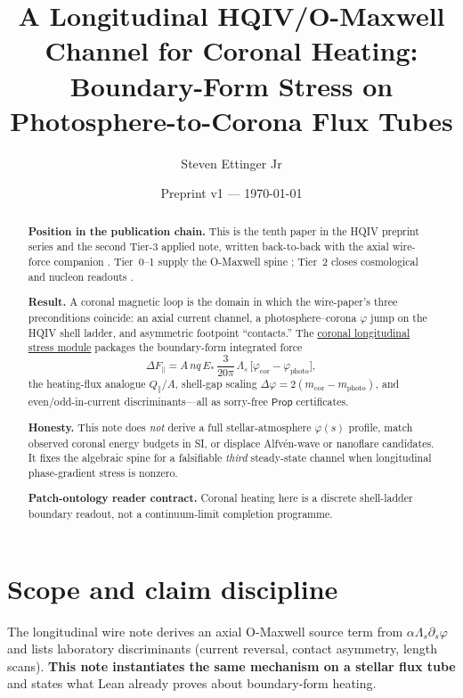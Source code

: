 \documentclass[11pt]{amsart}
\title[Coronal heating from longitudinal HQIV stress]{A Longitudinal HQIV/O-Maxwell Channel for Coronal Heating:\\
Boundary-Form Stress on Photosphere-to-Corona Flux Tubes}
\author{Steven Ettinger Jr}
\date{Preprint v1 --- \today}
\begin{document}
\begin{abstract}
\noindent\textbf{Position in the publication chain.}
This is the tenth paper in the HQIV preprint series and the
second Tier-3 applied note, written back-to-back with the axial wire-force
companion \cite{ettinger2026longitudinal}. Tier~0--1 supply the O-Maxwell spine
\cite{ettinger2026hqiv,hqiv-lightcone-paper,hqiv-so8-paper,hqiv-3d-growth-paper,hqiv-oct-action-paper,hqiv-kirchhoff-paper};
Tier~2 closes cosmological and nucleon readouts
\cite{hqiv-tuft-sm-lagrangian-paper,hqiv-baryogenesis-paper,hqiv-nucleon-binding-paper,hqiv-bbn-paper}.

\noindent\textbf{Result.}
A coronal magnetic loop is the domain in which the wire-paper's three
preconditions coincide: an axial current channel, a photosphere--corona
$\varphi$ jump on the HQIV shell ladder, and asymmetric footpoint
``contacts.'' The \hyperref[lean:coronal-longitudinal]{coronal longitudinal
stress module} packages the boundary-form integrated force
\[
\Delta F_\parallel
  = A\,nq\,E_\ast\,\frac{3}{20\pi}\,\Lambda_s\,
    \bigl[\varphi_{\mathrm{cor}}-\varphi_{\mathrm{photo}}\bigr],
\]
the heating-flux analogue $Q_\parallel/A$, shell-gap scaling
$\Delta\varphi=2(m_{\mathrm{cor}}-m_{\mathrm{photo}})$, and even/odd-in-current
discriminants---all as sorry-free $\mathsf{Prop}$ certificates.

\noindent\textbf{Honesty.}
This note does \emph{not} derive a full stellar-atmosphere $\varphi(s)$ profile,
match observed coronal energy budgets in SI, or displace Alfv\'en-wave or
nanoflare candidates. It fixes the algebraic spine for a falsifiable \emph{third}
steady-state channel when longitudinal phase-gradient stress is nonzero.

\noindent\textbf{Patch-ontology reader contract.}
Coronal heating here is a discrete shell-ladder boundary readout, not a
continuum-limit completion programme.
\end{abstract}
\maketitle



\section{Scope and claim discipline}
\label{sec:scope}

The longitudinal wire note \cite{ettinger2026longitudinal} derives an axial
O-Maxwell source term from $\alpha\Lambda_s\partial_s\varphi$ and lists
laboratory discriminants (current reversal, contact asymmetry, length scans).
\textbf{This note instantiates the same mechanism on a stellar flux tube} and
states what Lean already proves about boundary-form heating.
\end{document}
